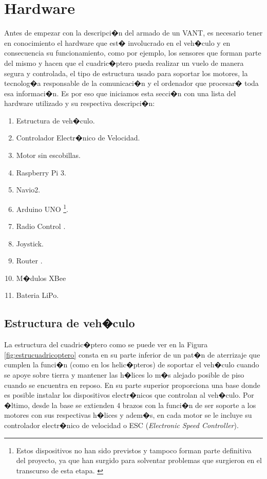 \section{Hardware}
\label{cap2:sec:hardware}

Antes de empezar con la descripci�n del armado de un VANT, es necesario tener en conocimiento el hardware que est� involucrado en el veh�culo y en consecuencia su funcionamiento, como por ejemplo, los sensores que forman parte del mismo y hacen que el cuadric�ptero pueda realizar un vuelo de manera segura y controlada, el tipo de estructura usado para soportar los motores, la tecnolog�a responsable de la comunicaci�n y el ordenador que procesar� toda esa informaci�n. Es por eso que iniciamos esta secci�n con una lista del hardware utilizado y su respectiva descripci�n:


\begin{enumerate}
	\item Estructura de veh�culo.
	\item Controlador Electr�nico de Velocidad.
	\item Motor sin escobillas.
	\item Raspberry Pi 3.
	\item Navio2.
	\item Arduino UNO \footnote{Estos dispositivos no han sido previstos y tampoco forman parte definitiva del proyecto, ya que han surgido para solventar problemas que surgieron en el transcurso de esta etapa. \label{footnote_hardware} }.
	\item Radio Control .
	\item Joystick.
	\item Router .
	\item M�dulos XBee
	\item Bateria LiPo.
\end{enumerate}




	\subsection{Estructura de veh�culo}

		La estructura del cuadric�ptero como se puede ver en la Figura \ref{fig:estrucuadricoptero} consta en su parte inferior de un pat�n de aterrizaje que cumplen la funci�n (como en los helic�pteros) de soportar el veh�culo cuando se apoye sobre tierra y mantener las h�lices lo m�s alejado posible de piso cuando se encuentra en reposo. En su parte superior proporciona una base donde es posible instalar los dispositivos electr�nicos que controlan al veh�culo. Por �ltimo, desde la base se extienden 4 brazos con la funci�n de ser soporte a los motores con sus respectivas h�lices y adem�s, en cada motor se le incluye su controlador electr�nico de velocidad o ESC (\textit{Electronic Speed Controller}). 




